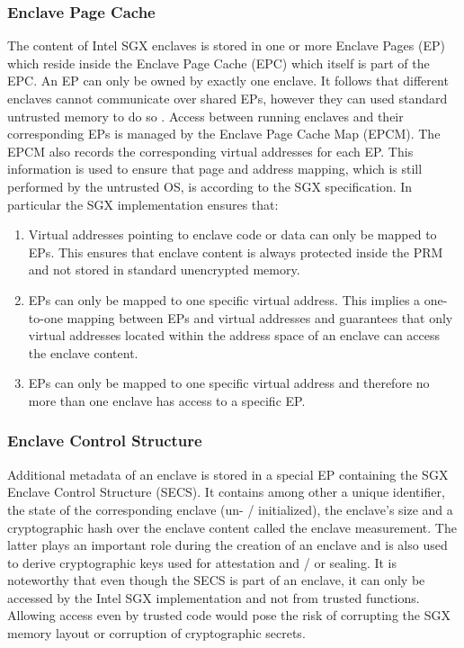\subsubsection{Enclave Page Cache}
The content of Intel SGX enclaves is stored in one or more Enclave Pages (EP) which reside inside the Enclave Page Cache (EPC) which itself is part of the EPC. An EP
can only be owned by exactly one enclave. It follows that different enclaves cannot communicate over shared EPs, however they can used standard untrusted memory to
do so \cite{Costan2016IntelSE}. Access between running enclaves and their corresponding EPs is managed by the Enclave Page Cache Map (EPCM). The EPCM also records
the corresponding virtual addresses for each EP. This information is used to ensure that page and address mapping, which is still performed by the untrusted OS, 
is according to the SGX specification. In particular the SGX implementation ensures that:
\begin{enumerate}
    \item Virtual addresses pointing to enclave code or data can only be mapped to EPs. This ensures that enclave content is always protected inside the PRM and not stored in
          standard unencrypted memory.
    \item EPs can only be mapped to one specific virtual address. This implies a one-to-one mapping between EPs and virtual addresses and guarantees that only virtual addresses
          located within the address space of an enclave can access the enclave content.
    \item EPs can only be mapped to one specific virtual address and therefore no more than one enclave has access to a specific EP.
\end{enumerate}

\subsubsection{Enclave Control Structure}
Additional metadata of an enclave is stored in a special EP containing the SGX Enclave Control Structure (SECS). It contains among other a unique identifier, the
state of the corresponding enclave (un- / initialized), the enclave's size and a cryptographic hash over the enclave content called the enclave measurement. The latter
plays an important role during the creation of an enclave and is also used to derive cryptographic keys used for attestation and / or sealing. It is noteworthy that even
though the SECS is part of an enclave, it can only be accessed by the Intel SGX implementation and not from trusted functions. Allowing access even by trusted code would
pose the risk of corrupting the SGX memory layout or corruption of cryptographic secrets.